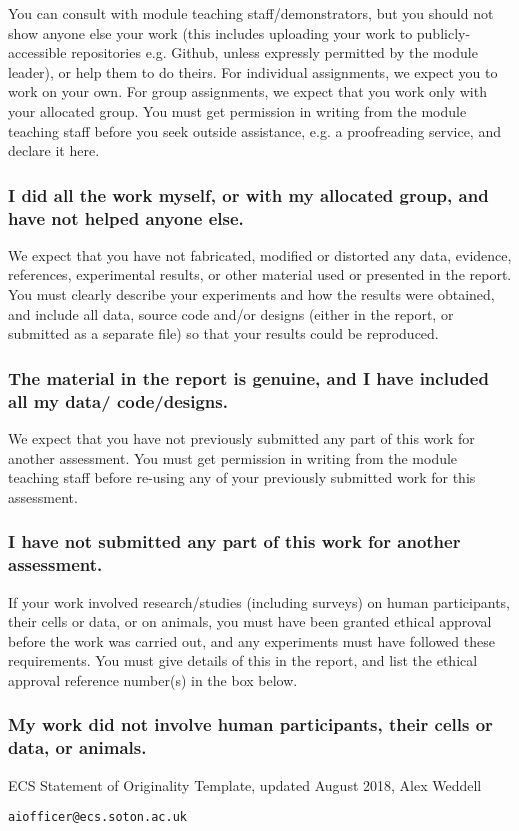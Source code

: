You can consult with module teaching staff/demonstrators, but you should not show anyone else your work (this includes uploading your work to publicly-accessible repositories e.g. Github, unless expressly permitted by the module leader), or help them to do theirs. For individual assignments, we expect you to work on your own. For group assignments, we expect that you work only with your allocated group. You must get permission in writing from the module teaching staff before you seek outside assistance, e.g. a proofreading service, and declare it here.

\subsubsection*{I did all the work myself, or with my allocated group, and have not helped anyone else.}

We expect that you have not fabricated, modified or distorted any data, evidence, references, experimental results, or other material used or presented in the report. You must clearly describe your experiments and how the results were obtained, and include all data, source code and/or designs (either in the report, or submitted as a separate file) so that your results could be reproduced. 

\subsubsection*{The material in the report is genuine, and I have included all my data/ code/designs.}

We expect that you have not previously submitted any part of this work for another assessment. You must get permission in writing from the module teaching staff before re-using any of your previously submitted work for this assessment.

\subsubsection*{I have not submitted any part of this work for another assessment.}

If your work involved research/studies (including surveys) on human participants, their cells or data, or on animals, you must have been granted ethical approval before the work was carried out, and any experiments must have followed these requirements. You must give details of this in the report, and list the ethical approval reference number(s) in the box below.

\subsubsection*{My work did not involve human participants, their cells or data, or animals.}

ECS Statement of Originality Template, updated August 2018, Alex Weddell 

\verb|aiofficer@ecs.soton.ac.uk|
